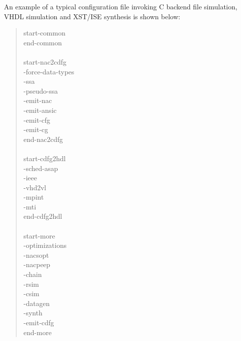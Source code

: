 \documentclass[a4paper]{article}
\begin{document}
An example of a typical configuration file invoking C backend file simulation, VHDL simulation and XST/ISE synthesis is shown below:
%
\begin{quote}{\ttfamily \raggedright \noindent
start-common\\
end-common\\
~\\
start-nac2cdfg\\
-force-data-types\\
-ssa\\
-pseudo-ssa\\
-emit-nac\\
-emit-ansic\\
-emit-cfg\\
-emit-cg\\
end-nac2cdfg\\
~\\
start-cdfg2hdl\\
-sched-asap\\
-ieee\\
-vhd2vl\\
-mpint\\
-mti\\
end-cdfg2hdl\\
~\\
start-more\\
-optimizations\\
-nacsopt\\
-nacpeep\\
-chain\\
-rsim\\
-csim\\
-datagen\\
-synth\\
-emit-cdfg\\
end-more
}
\end{quote}
\end{document}
